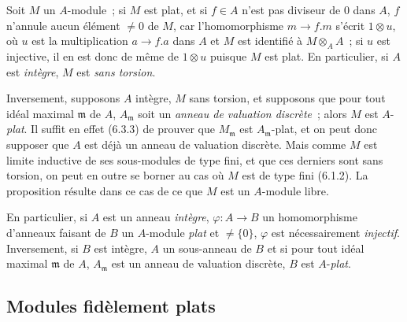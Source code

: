 \begin{env}[6.3.4]
\label{0.6.3.4-fr}
Soit $M$ un $A$-module~; si $M$ est plat, et si $f\in A$ n'est pas diviseur
de $0$ dans $A$, $f$ n'annule aucun élément $\neq0$ de $M$, car
l'homomorphisme $m\to f.m$ s'écrit $1\otimes u$, où $u$ est la
multiplication $a\to f.a$ dans $A$ et $M$ est identifié à
$M\otimes_A A$~; si $u$ est injective, il en est donc de même de
$1\otimes u$ puisque $M$ est plat. En particulier, si $A$ est
\emph{intègre}, $M$ est \emph{sans torsion}.

Inversement, supposons $A$ intègre, $M$ sans torsion, et supposons que pour
tout idéal maximal $\mathfrak{m}$ de $A$, $A_\mathfrak{m}$ soit un
\emph{anneau de valuation discrète}~; alors $M$ est $A$-\emph{plat}. Il suffit en
effet (6.3.3) de prouver que $M_\mathfrak{m}$ est $A_\mathfrak{m}$-plat, et
on peut donc supposer que $A$ est déjà un anneau de valuation discrète. Mais
comme $M$ est limite inductive de ses sous-modules de type fini, et que ces
derniers sont sans torsion, on peut en outre se borner au cas où $M$ est de
type fini (6.1.2). La proposition résulte dans ce cas de ce que $M$ est un
$A$-module libre.

En particulier, si $A$ est un anneau \emph{intègre},
$\varphi:A\to B$ un homomorphisme d'anneaux faisant de $B$ un $A$-module
\emph{plat} et $\neq\{0\}$, $\varphi$ est nécessairement \emph{injectif}.
Inversement, si $B$ est intègre, $A$ un sous-anneau de $B$ et si pour tout
idéal maximal $\mathfrak{m}$ de $A$, $A_\mathfrak{m}$ est un anneau de
valuation discrète, $B$ est $A$-\emph{plat}.
\end{env}

\subsection{Modules fidèlement plats}
\label{subsection:0.6.4-fr}

